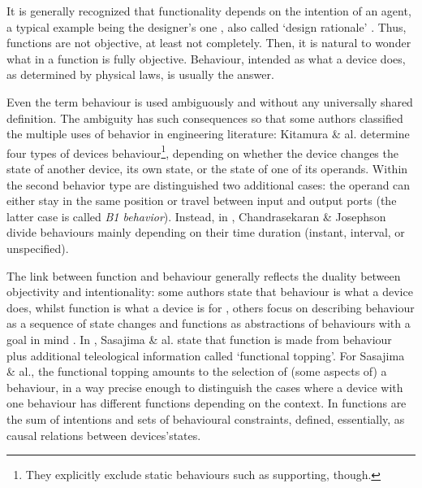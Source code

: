 \documentclass[sw]{iosart2x}
\newcommand{\firstTimeKeyWord}[1]{\textit{#1}}
\newcommand{\quotes}[1]{`#1'}
\newcommand{\TODO}[1]{{\color{red} #1}}
\begin{document}
It is generally recognized that functionality depends on the intention of an agent, a typical example being the designer's one \cite{kitamuraOntologyBasedFunctionalKnowledgeModeling2004}, also called \quotes{design rationale} \cite{chandrasekaranFunctionalRepresentationDesign1993}. 
Thus, functions are not objective, at least not completely. 
Then, it is natural to wonder what in a function is fully objective. Behaviour, intended as what a device does, as determined by physical laws, is usually the answer.    


Even the term behaviour is used ambiguously and without any universally shared definition. 
The ambiguity has such consequences so that some authors classified the multiple uses of behavior in engineering literature: 
Kitamura \& al. \cite{kitamuraOntologyBasedFunctionalKnowledgeModeling2004} determine four types of devices behaviour\footnote{They explicitly exclude static behaviours such as supporting, though.}, depending on whether the device changes the state of another device, its own state, or the state of one of its operands. Within the second behavior type are distinguished two additional cases: the operand can either stay in the same position or travel between input and output ports (the latter case is called \firstTimeKeyWord{B1 behavior}).
Instead, in \cite{chandrasekaranFunctionDeviceRepresentation2000}, Chandrasekaran \& Josephson divide behaviours mainly depending on their time duration (instant, interval, or unspecified).


The link between function and behaviour generally reflects the duality between objectivity and intentionality: some authors state that behaviour is what a device does, whilst function is what a device is for \cite{kleer_qualitative_1984}, others focus on describing behaviour as a sequence of state changes and functions as abstractions of behaviours with a goal in mind \cite{umedaFunctionBehaviourStructure1990}.  
In \cite{sasajimaFBRLFunctionBehavior1995, sasajimaInvestigationDomainOntology1994}, Sasajima \& al. state that function is made from behaviour plus additional teleological information called \quotes{functional topping}.
For Sasajima \& al., the functional topping amounts to the selection of (some aspects of) a behaviour, in a way precise enough to distinguish the cases where a device with one behaviour has different functions depending on the context. 
In \cite{chandrasekaranFunctionDeviceRepresentation2000} functions are the sum of intentions and sets of behavioural constraints, defined, essentially, as causal relations between devices'states.
\end{document}
